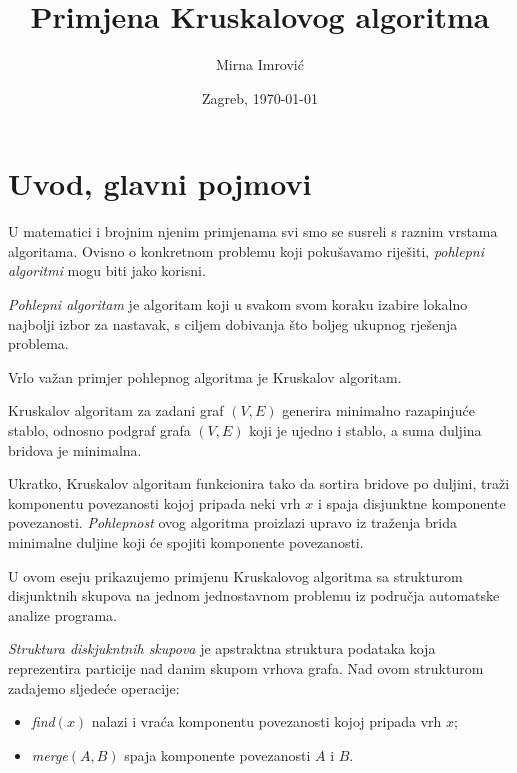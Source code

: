 \documentclass[12pt]{scrartcl}
\begin{document}
\title{Primjena Kruskalovog algoritma}  
\author{Mirna Imrović}
\date{Zagreb, \today}
\maketitle

\tableofcontents

\section{Uvod, glavni pojmovi}

U matematici i brojnim njenim primjenama svi smo se susreli s raznim vrstama algoritama. Ovisno o konkretnom problemu koji pokušavamo riješiti, \emph{pohlepni algoritmi} mogu biti jako korisni. 

\begin{definicija}\label{def:pohlepni}
\emph{Pohlepni algoritam} je algoritam koji u svakom svom koraku izabire lokalno najbolji izbor za nastavak, s ciljem dobivanja što boljeg ukupnog rješenja problema. 
\end{definicija}

Vrlo važan primjer pohlepnog algoritma je Kruskalov algoritam.

\begin{teorem}
Kruskalov algoritam za zadani graf $(V,E)$ generira minimalno razapinjuće stablo, odnosno podgraf grafa $(V,E)$ koji je ujedno i stablo, a suma duljina bridova je minimalna.
\end{teorem}

Ukratko, Kruskalov algoritam funkcionira tako da sortira bridove po duljini, traži komponentu povezanosti kojoj pripada neki vrh $x$ i spaja disjunktne komponente povezanosti. \emph{Pohlepnost} ovog algoritma proizlazi upravo iz traženja brida minimalne duljine koji će spojiti komponente povezanosti.

U ovom eseju prikazujemo primjenu Kruskalovog algoritma sa strukturom disjunktnih skupova na jednom jednostavnom problemu iz područja automatske analize programa.

\begin{definicija}\label{def:sds}
\cite{singer} \emph{Struktura diskjukntnih skupova} je apstraktna struktura podataka koja reprezentira particije nad danim skupom vrhova grafa. Nad ovom strukturom zadajemo sljedeće operacije:
\begin{itemize}
    \item \textsl{find}$(x)$ nalazi i vraća komponentu povezanosti kojoj pripada vrh $x$;
    \item \textsl{merge}$(A,B)$ spaja komponente povezanosti $A$ i $B$. \qedhere
\end{itemize}
\end{definicija}
\end{document}
